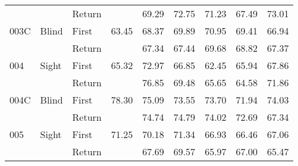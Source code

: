 \begin{table}[!htb]
\begin{tabular}{lllrrrrrr}
    &       & Return &          &  69.29 &  72.75 &                                                 71.23 &                                                  67.49 &   73.01 \\
003C & Blind & First &    63.45 &  68.37 &  69.89 &                                                 70.95 &                                                  69.41 &   66.94 \\
    &       & Return &          &  67.34 &  67.44 &                                                 69.68 &                                                  68.82 &   67.37 \\
004 & Sight & First &    65.32 &  72.97 &  66.85 &                                                 62.45 &                                                  65.94 &   67.86 \\
    &       & Return &          &  76.85 &  69.48 &                                                 65.65 &                                                  64.58 &   71.86 \\
004C & Blind & First &    78.30 &  75.09 &  73.55 &                                                 73.70 &                                                  71.94 &   74.03 \\
    &       & Return &          &  74.74 &  74.79 &                                                 74.02 &                                                  72.69 &   67.34 \\
005 & Sight & First &    71.25 &  70.18 &  71.34 &                                                 66.93 &                                                  66.46 &   67.06 \\
    &       & Return &          &  67.69 &  69.57 &                                                 65.97 &                                                  67.00 &   65.47 \\
\bottomrule
\end{tabular}
\end{table}

